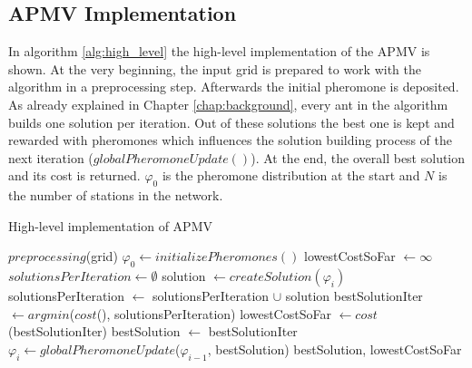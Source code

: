 \subsection{APMV Implementation}
In algorithm \ref{alg:high_level} the high-level implementation of the APMV is shown. At the very beginning, the input grid is prepared to work with the algorithm in a preprocessing step. Afterwards the initial pheromone is deposited. As already explained in Chapter \ref{chap:background}, every ant in the algorithm builds one solution per iteration. Out of these solutions the best one is kept and rewarded with pheromones which influences the solution building process of the next iteration ($globalPheromoneUpdate()$). At the end, the overall best solution and its cost is returned. $\varphi_0$ is the pheromone distribution at the start and $N$ is the number of stations in the network.

\begin{algorithm}[h]
	\caption{High-level implementation of APMV}
	\label{alg:high_level}
	\begin{algorithmic}[1]
		\State $preprocessing$(grid) 
		\State $\varphi_0 \gets initializePheromones()$ 
		\State lowestCostSoFar $\gets \infty$ 
		\State $solutionsPerIteration \gets \emptyset$
		\State solution $\gets createSolution(\varphi_i)$
		\State solutionsPerIteration $\gets$ solutionsPerIteration $\cup$ solution
		\EndFor
		\State bestSolutionIter $\gets argmin$($cost$(), solutionsPerIteration)
		\State lowestCostSoFar $\gets cost$(bestSolutionIter)
		\State bestSolution $\gets$ bestSolutionIter
		\EndIf
		\State $\varphi_i \gets globalPheromoneUpdate$($\varphi_{i-1}$, bestSolution)
		\EndFor
		\State \Return bestSolution, lowestCostSoFar
	\end{algorithmic}
\end{algorithm}

